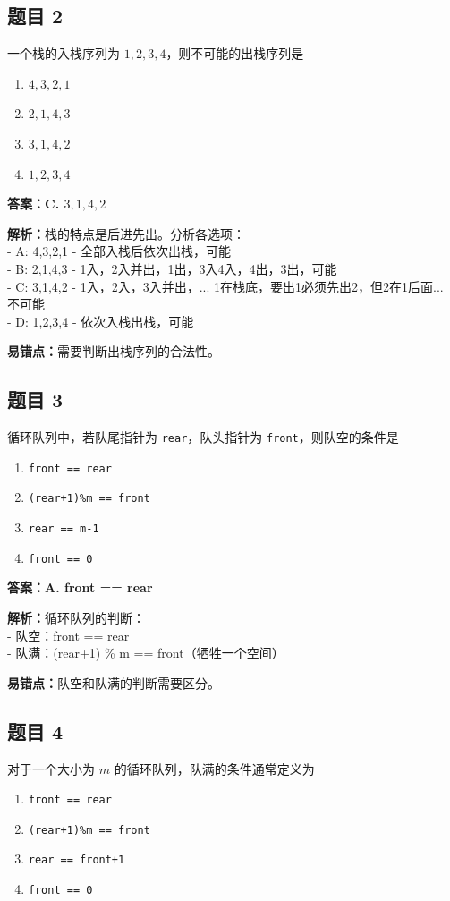 \documentclass[12pt,a4paper]{ctexart}
\begin{document}
\subsection*{题目 2}
一个栈的入栈序列为 $1,2,3,4$，则不可能的出栈序列是
\begin{enumerate}[label=\Alph*.]
	\item $4,3,2,1$
	\item $2,1,4,3$
	\item $3,1,4,2$
	\item $1,2,3,4$
\end{enumerate}

\begin{answerbox}
	\textbf{答案：C. $3,1,4,2$}

	\textbf{解析：}栈的特点是后进先出。分析各选项：\\
	- A: 4,3,2,1 - 全部入栈后依次出栈，可能\\
	- B: 2,1,4,3 - 1入，2入并出，1出，3入4入，4出，3出，可能\\
	- C: 3,1,4,2 - 1入，2入，3入并出，... 1在栈底，要出1必须先出2，但2在1后面... 不可能\\
	- D: 1,2,3,4 - 依次入栈出栈，可能

	\textbf{易错点：}需要判断出栈序列的合法性。
\end{answerbox}

\subsection*{题目 3}
循环队列中，若队尾指针为 \texttt{rear}，队头指针为 \texttt{front}，则队空的条件是
\begin{enumerate}[label=\Alph*.]
	\item \texttt{front == rear}
	\item \texttt{(rear+1)\%m == front}
	\item \texttt{rear == m-1}
	\item \texttt{front == 0}
\end{enumerate}

\begin{answerbox}
	\textbf{答案：A. front == rear}

	\textbf{解析：}循环队列的判断：\\
	- 队空：front == rear\\
	- 队满：(rear+1) \% m == front（牺牲一个空间）

	\textbf{易错点：}队空和队满的判断需要区分。
\end{answerbox}

\subsection*{题目 4}
对于一个大小为 $m$ 的循环队列，队满的条件通常定义为
\begin{enumerate}[label=\Alph*.]
	\item \texttt{front == rear}
	\item \texttt{(rear+1)\%m == front}
	\item \texttt{rear == front+1}
	\item \texttt{front == 0}
\end{enumerate}
\end{document}
